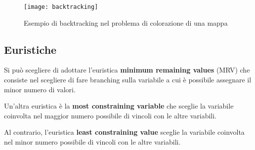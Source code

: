 \begin{figure}[H]
\caption{Esempio di backtracking nel problema di colorazione di una mappa}
\centering
\texttt{[image: backtracking]}
\end{figure}

\subsection{Euristiche}

Si può scegliere di adottare l'euristica \textbf{minimum remaining values}
(MRV) che consiste nel scegliere di fare branching sulla variabile a cui è
possibile assegnare il minor numero di valori.

Un'altra euristica è la \textbf{most constraining variable} che sceglie la
variabile coinvolta nel maggior numero possibile di vincoli con le altre variabili.

Al contrario, l'euristica \textbf{least constraining value} sceglie la
variabile coinvolta nel minor numero possibile di vincoli con le altre variabili.


